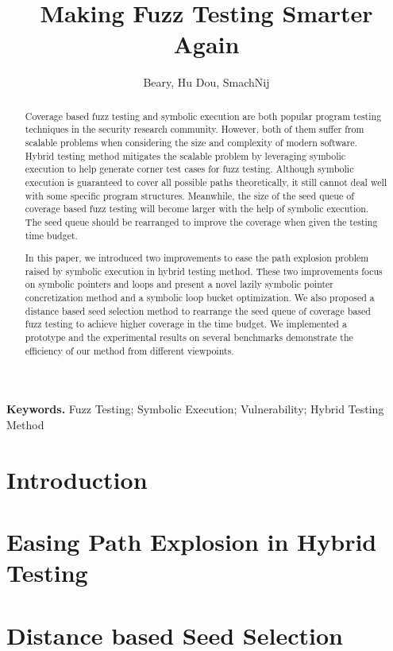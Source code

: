 \documentclass[a4paper]{article}
\begin{document}
\title{Making Fuzz Testing Smarter Again}
\author{Beary, Hu Dou, SmachNij}
\maketitle

\begin{abstract}
Coverage based fuzz testing and symbolic execution are both popular program testing techniques in the security research community. However, both of them suffer from scalable problems when considering the size and complexity of modern software. Hybrid testing method mitigates the scalable problem by leveraging symbolic execution to help generate corner test cases for fuzz testing. Although symbolic execution is guaranteed to cover all possible paths theoretically, it still cannot deal well with some specific program structures. Meanwhile, the size of the seed queue of coverage based fuzz testing will become larger with the help of symbolic execution. The seed queue should be rearranged to improve the coverage when given the testing time budget.

In this paper, we introduced two improvements to ease the path explosion problem raised by symbolic execution in hybrid testing method. 
These two improvements focus on symbolic pointers and loops and present a novel lazily symbolic pointer concretization method and a symbolic loop bucket optimization. 
We also proposed a distance based seed selection method to rearrange the seed queue of coverage based fuzz testing to achieve higher coverage in the time budget. We implemented a prototype and the experimental results on several benchmarks demonstrate the efficiency of our method from different viewpoints.
\end{abstract}
\textbf{Keywords.} Fuzz Testing; Symbolic Execution; Vulnerability; Hybrid Testing Method

\section{Introduction} \label{sec:introduction}


\section{Easing Path Explosion in Hybrid Testing} \label{sec:ease PE}


\section{Distance based Seed Selection} \label{sec:seed selection}

\end{document}
